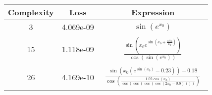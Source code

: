 \begin{center}
        \begin{tabular}{|c|c|c|}
        \hline
        Complexity & Loss & Expression \\
        \hline
        3 & 4.069e-09 & $\begin{aligned}\sin{\left(e^{x_{0}} \right)}\end{aligned}$\\ \hline15 & 1.118e-09 & $\begin{aligned}\frac{\sin{\left(x_{0} e^{\sin{\left(x_{0} + \frac{0.56}{x_{0}} \right)}} \right)}}{\cos{\left(\sin{\left(e^{x_{0}} \right)} \right)}}\end{aligned}$\\ \hline26 & 4.169e-10 & $\begin{aligned}\frac{\sin{\left(x_{0} \left(e^{\sin{\left(x_{0} \right)}} - 0.23\right) \right)} - 0.18}{\cos{\left(\frac{1.02 \cos{\left(x_{0} \right)}}{\cos{\left(\cos{\left(\cos{\left(\cos{\left(2 x_{0} - 0.8 \right)} \right)} \right)} \right)}} \right)}}\end{aligned}$\\ \hline\end{tabular}
        \end{center}
        